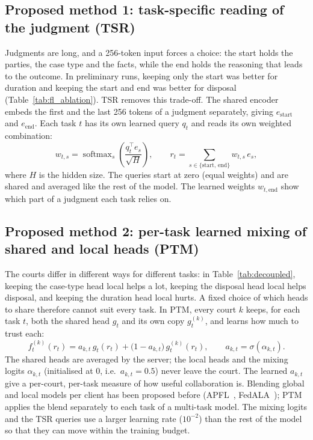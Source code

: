 \subsection{Proposed method 1: task-specific reading of the judgment (TSR)}
Judgments are long, and a 256-token input forces a choice: the start holds the parties, the case type and the facts, while the end holds the reasoning that leads to the outcome. In preliminary runs, keeping only the start was better for duration and keeping the start and end was better for disposal (Table~\ref{tab:fl_ablation}). TSR removes this trade-off. The shared encoder embeds the first and the last 256 tokens of a judgment separately, giving $e_{\text{start}}$ and $e_{\text{end}}$. Each task $t$ has its own learned query $q_t$ and reads its own weighted combination:
\begin{equation}
w_{t,s} = \operatorname{softmax}_{s}\!\left(\frac{q_t^\top e_s}{\sqrt{H}}\right), \qquad
r_t = \sum_{s\in\{\text{start},\,\text{end}\}} w_{t,s}\, e_s ,
\end{equation}
where $H$ is the hidden size. The queries start at zero (equal weights) and are shared and averaged like the rest of the model. The learned weights $w_{t,\text{end}}$ show which part of a judgment each task relies on.

\subsection{Proposed method 2: per-task learned mixing of shared and local heads (PTM)}
The courts differ in different ways for different tasks: in Table~\ref{tab:decoupled}, keeping the case-type head local helps a lot, keeping the disposal head local helps disposal, and keeping the duration head local hurts. A fixed choice of which heads to share therefore cannot suit every task. In PTM, every court $k$ keeps, for each task $t$, both the shared head $g_t$ and its own copy $g_t^{(k)}$, and learns how much to trust each:
\begin{equation}
f_t^{(k)}(r_t) = a_{k,t}\, g_t(r_t) + \bigl(1-a_{k,t}\bigr)\, g_t^{(k)}(r_t), \qquad a_{k,t} = \sigma(\alpha_{k,t}).
\end{equation}
The shared heads are averaged by the server; the local heads and the mixing logits $\alpha_{k,t}$ (initialised at $0$, i.e.\ $a_{k,t}=0.5$) never leave the court. The learned $a_{k,t}$ give a per-court, per-task measure of how useful collaboration is. Blending global and local models per client has been proposed before (APFL~\cite{deng2020apfl}, FedALA~\cite{zhang2023fedala}); PTM applies the blend separately to each task of a multi-task model. The mixing logits and the TSR queries use a larger learning rate ($10^{-2}$) than the rest of the model so that they can move within the training budget.

